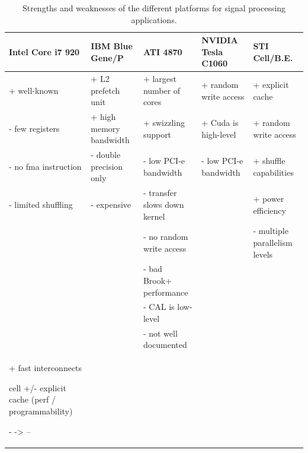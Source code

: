 \documentclass{article}
\begin{document}
\begin{table}[t]
\begin{center}
{\footnotesize
\begin{tabular}{l|l|l|l|l}
Intel Core i7 920            & IBM Blue Gene/P                  & ATI 4870                     & NVIDIA Tesla C1060           & STI  Cell/B.E.                \\
\hline
+ well-known                 & + L2 prefetch unit               & + largest number of cores    & + random write access        & + explicit cache              \\
- few registers              & + high memory bandwidth          & + swizzling support          & + Cuda is high-level         & + random write access         \\
- no fma instruction         & - double precision only          & - low PCI-e bandwidth        & - low PCI-e bandwidth        & + shuffle capabilities        \\
- limited shuffling          & - expensive                      & - transfer slows down kernel &                              & + power efficiency            \\
                             &                                  & - no random write access     &                              & - multiple parallelism levels \\
                             &                                  & - bad Brook+ performance     &                              &                               \\
                             &                                  & - CAL is low-level           &                              &                               \\
                             &                                  & - not well documented        &                              &                               \\
                                 + fast interconnects

cell +/- explicit cache (perf / programmability)

- -> --

\end{tabular}
} %
\end{center}
\vspace{-0.5cm}
\caption{Strengths and weaknesses of the different platforms for signal processing applications.}
\label{architecture-results-table}
\end{table}
\end{document}
